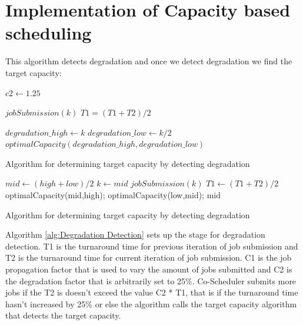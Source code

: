 \documentclass[ms,electronic,double]{nuthesis}
\begin{document}
\section{Implementation of Capacity based scheduling}

This algorithm detects degradation and once we detect degradation we find the 
target capacity:

\begin{algorithm}
\begin{algorithmic}
\STATE $c2 \gets 1.25$ 

  \STATE $jobSubmission(k)$ 
  \STATE $T1=(T1+T2)/2$
\ENDIF

  \STATE $degradation\_high \gets k$
  \STATE $degradation\_low \gets k/2$
  \STATE $optimalCapacity(degradation\_high,degradation\_low)$
\ENDIF

\ENDWHILE

\end{algorithmic}
\caption{Algorithm for determining target capacity by detecting degradation}
\label{alg:Degradation Detection}
\end{algorithm}


\begin{algorithm}
\begin{algorithmic}

\STATE $mid \gets (high+low)/2$ 
\STATE $k \gets mid$
\STATE $jobSubmission(k)$ 
\STATE $T1 \gets (T1+T2)/2$
\STATE optimalCapacity(mid,high);
\ENDIF  
{}
\STATE optimalCapacity(low,mid);
\ENDIF
\RETURN mid
\end{algorithmic}
\caption{Algorithm for determining target capacity by detecting degradation}
\label{alg:optimalCapacity(high,low)}
\end{algorithm}

Algorithm \ref{alg:Degradation Detection} sets up the stage for degradation 
detection. T1 is the turnaround time for previous iteration of job submission
and T2 is the turnaround time for current iteration of job submission. C1 is the 
job propagation factor that is used to vary the amount of jobs submitted and C2 
is the degradation factor that is arbitrarily set to 25\%.
Co-Scheduler submits more jobs if the T2 is doesn't exceed the value C2 * T1, that is if the turnaround time
hasn't increased by 25\% or else the 
algorithm calls the target capacity algorithm that detects the target capacity.
\end{document}
